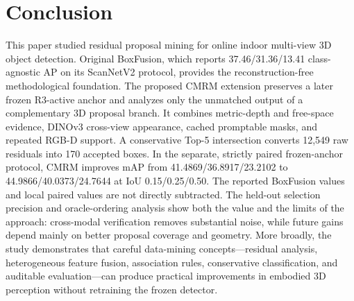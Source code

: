 \documentclass[11pt,a4paper]{article}
\begin{document}
\section{Conclusion}
This paper studied residual proposal mining for online indoor multi-view 3D object detection. Original BoxFusion, which reports 37.46/31.36/13.41 class-agnostic AP on its ScanNetV2 protocol, provides the reconstruction-free methodological foundation. The proposed CMRM extension preserves a later frozen R3-active anchor and analyzes only the unmatched output of a complementary 3D proposal branch. It combines metric-depth and free-space evidence, DINOv3 cross-view appearance, cached promptable masks, and repeated RGB-D support. A conservative Top-5 intersection converts 12,549 raw residuals into 170 accepted boxes. In the separate, strictly paired frozen-anchor protocol, CMRM improves mAP from 41.4869/36.8917/23.2102 to 44.9866/40.0373/24.7644 at IoU 0.15/0.25/0.50. The reported BoxFusion values and local paired values are not directly subtracted. The held-out selection precision and oracle-ordering analysis show both the value and the limits of the approach: cross-modal verification removes substantial noise, while future gains depend mainly on better proposal coverage and geometry. More broadly, the study demonstrates that careful data-mining concepts---residual analysis, heterogeneous feature fusion, association rules, conservative classification, and auditable evaluation---can produce practical improvements in embodied 3D perception without retraining the frozen detector.



\end{document}
